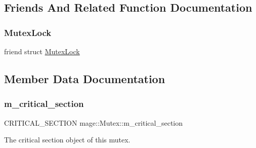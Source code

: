\subsection{Friends And Related Function Documentation}
\hypertarget{classmage_1_1_mutex_a058473d070063e5098732f355f432bd9}{}\label{classmage_1_1_mutex_a058473d070063e5098732f355f432bd9} 
\subsubsection{\texorpdfstring{Mutex\+Lock}{MutexLock}}
{\footnotesize\ttfamily friend struct \hyperlink{structmage_1_1_mutex_lock}{Mutex\+Lock}\hspace{0.3cm}{\ttfamily [friend]}}



\subsection{Member Data Documentation}
\hypertarget{classmage_1_1_mutex_a18414337aef28b7ed261e7a805d2c103}{}\label{classmage_1_1_mutex_a18414337aef28b7ed261e7a805d2c103} 
\subsubsection{\texorpdfstring{m\+\_\+critical\+\_\+section}{m\_critical\_section}}
{\footnotesize\ttfamily C\+R\+I\+T\+I\+C\+A\+L\+\_\+\+S\+E\+C\+T\+I\+ON mage\+::\+Mutex\+::m\+\_\+critical\+\_\+section\hspace{0.3cm}{\ttfamily [private]}}

The critical section object of this mutex. 